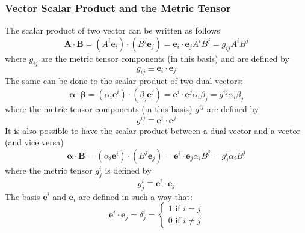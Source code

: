 \subsubsection{Vector Scalar Product and the Metric Tensor}
The scalar product of two vector can be written as follows
\begin{equation}
\label{eqn:PE1}
\bm A \cdot \bm B=(A^i\bm e_i)\cdot(B^j\bm e_j)=\bm e_i \cdot\bm e_j A^iB^j=g_{ij}A^iB^j
\end{equation}
where $g_{ij}$ are the metric tensor components (in this basis) and are defined by
\begin{equation}
g_{ij}\equiv\bm e_i \cdot\bm e_j
\end{equation}
The same can be done to the scalar product of two dual vectors:
\begin{equation}
\label{eqn:PE2}
\bm\alpha\cdot\bm\beta=(\alpha_i\bm e^i)\cdot(\beta_j\bm e^j)=\bm e^i \cdot\bm e^j\alpha_i\beta_j=g^{ij}\alpha_i\beta_j
\end{equation}
where the metric tensor components (in this basis) $g^{ij}$ are defined by
\begin{equation}
g^{ij}\equiv\bm e^i \cdot\bm e^j
\end{equation}
It is also possible to have the scalar product between a dual vector and a vector (and vice versa)
\begin{equation}
\label{eqn:PE3}
\bm\alpha\cdot\bm B=(\alpha_i\bm e^i)\cdot(B^j\bm e_j)=\bm e^i \cdot\bm e_j \alpha_iB^j=g^i_j\alpha_iB^j
\end{equation}
where the metric tensor $g^i_j$ is defined by
\begin{equation}
g^i_j\equiv\bm e^i \cdot\bm e_j
\end{equation}
The basis $\bm e^i$ and $\bm e_i$ are defined in such a way that:
\begin{equation}
\bm e^i\cdot\bm e_j=\delta^i_j=
\begin{cases}
1 \text{ if } i=j\\
0 \text { if } i\neq j
\end{cases}
\end{equation}